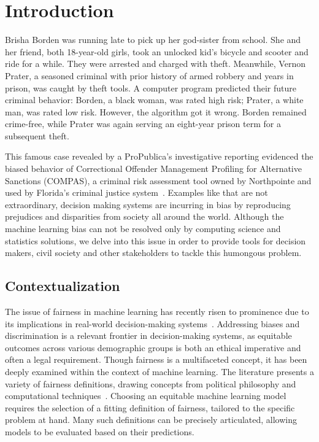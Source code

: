 \chapter{Introduction}

Brisha Borden was running late to pick up her god-sister from school. She and her friend, both 18-year-old girls, took an unlocked kid’s bicycle and scooter and ride for a while. They were arrested and charged with theft. Meanwhile, Vernon Prater, a seasoned criminal with prior history of armed robbery and years in prison, was caught by theft tools. A computer program predicted their future criminal behavior: Borden, a black woman, was rated high risk; Prater, a white man, was rated low risk. However, the algorithm got it wrong. Borden remained crime-free, while Prater was again serving an eight-year prison term for a subsequent theft.

This famous case revealed by a ProPublica's investigative reporting evidenced the biased behavior of Correctional Offender Management Profiling for Alternative Sanctions (COMPAS), a criminal risk assessment tool owned by Northpointe and used by Florida's criminal justice system~\citep{machine_bias}. Examples like that are not extraordinary, decision making systems are incurring in bias by reproducing prejudices and disparities from society all around the world. Although the machine learning bias can not be resolved only by computing science and statistics solutions, we delve into this issue in order to provide tools for decision makers, civil society and other stakeholders to tackle this humongous problem. 

\section{Contextualization}

The issue of fairness in machine learning has recently risen to prominence due to its implications in real-world decision-making systems~\citep{Mehrabi2019,Hutchinson2019}. Addressing biases and discrimination is a relevant frontier in decision-making systems, as equitable outcomes across various demographic groups is both an ethical imperative and often a legal requirement. Though fairness is a multifaceted concept, it has been deeply examined within the context of machine learning. The literature presents a variety of fairness definitions, drawing concepts from political philosophy and computational techniques~\citep{caton2023, Hutchinson2019}. Choosing an equitable machine learning model requires the selection of a fitting definition of fairness, tailored to the specific problem at hand. Many such definitions can be precisely articulated, allowing models to be evaluated based on their predictions.

